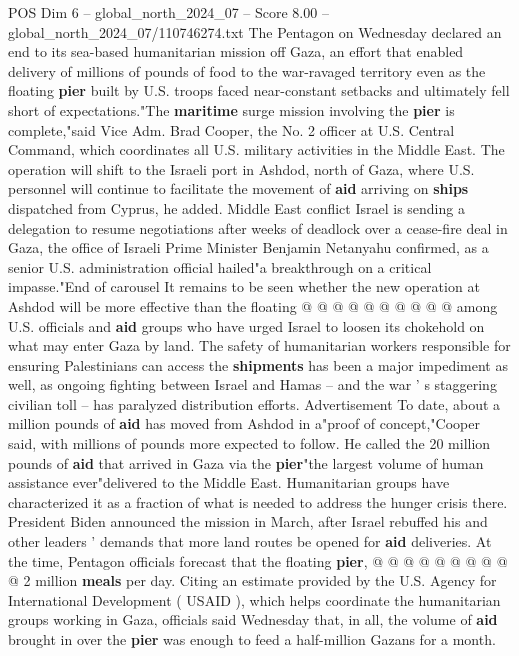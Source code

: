 \begin{textsample}{POS Dim 6 – global\_north\_2024\_07 – Score 8.00 – global\_north\_2024\_07/110746274.txt}  \label{ex:f6_pos_305}
The Pentagon on Wednesday declared an end to its sea-based humanitarian mission off Gaza, an effort that enabled delivery of millions of pounds of food to the war-ravaged territory even as the floating \textbf{pier} built by U.S. troops faced near-constant setbacks and ultimately fell short of expectations."The \textbf{maritime} surge mission involving the \textbf{pier} is complete,"said Vice Adm.
Brad Cooper, the No. 2 officer at U.S.
Central Command, which coordinates all U.S. military activities in the Middle East.
The operation will shift to the Israeli port in Ashdod, north of Gaza, where U.S. personnel will continue to facilitate the movement of \textbf{aid} arriving on \textbf{ships} dispatched from Cyprus, he added.
Middle East conflict Israel is sending a delegation to resume negotiations after weeks of deadlock over a cease-fire deal in Gaza, the office of Israeli Prime Minister Benjamin Netanyahu confirmed, as a senior U.S. administration official hailed"a breakthrough on a critical impasse."End of carousel It remains to be seen whether the new operation at Ashdod will be more effective than the floating @ @ @ @ @ @ @ @ @ @ among U.S. officials and \textbf{aid} groups who have urged Israel to loosen its chokehold on what may enter Gaza by land.
The safety of humanitarian workers responsible for ensuring Palestinians can access the \textbf{shipments} has been a major impediment as well, as ongoing fighting between Israel and Hamas -- and the war ' s staggering civilian toll -- has paralyzed distribution efforts.
Advertisement To date, about a million pounds of \textbf{aid} has moved from Ashdod in a"proof of concept,"Cooper said, with millions of pounds more expected to follow.
He called the 20 million pounds of \textbf{aid} that arrived in Gaza via the \textbf{pier}"the largest volume of human assistance ever"delivered to the Middle East.
Humanitarian groups have characterized it as a fraction of what is needed to address the hunger crisis there.
President Biden announced the mission in March, after Israel rebuffed his and other leaders ' demands that more land routes be opened for \textbf{aid} deliveries.
At the time, Pentagon officials forecast that the floating \textbf{pier}, @ @ @ @ @ @ @ @ @ @ 2 million \textbf{meals} per day.
Citing an estimate provided by the U.S.
Agency for International Development ( USAID ), which helps coordinate the humanitarian groups working in Gaza, officials said Wednesday that, in all, the volume of \textbf{aid} brought in over the \textbf{pier} was enough to feed a half-million Gazans for a month.

\end{textsample}
